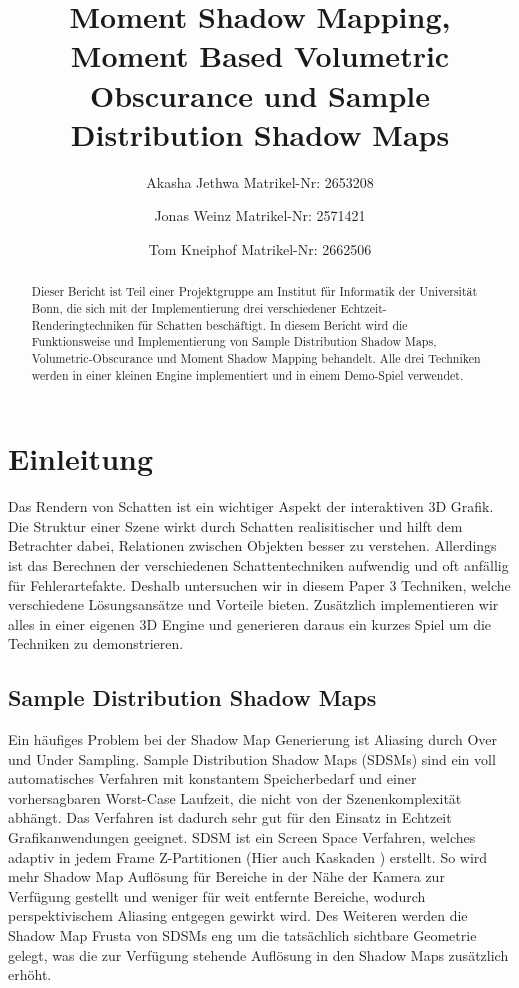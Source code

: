 \documentclass[runningheaders,a4paper]{llncs}
\title{ Moment Shadow Mapping, Moment Based Volumetric Obscurance und Sample Distribution Shadow Maps }
\author{
	Akasha Jethwa 
	Matrikel-Nr: 2653208
	\and
	Jonas Weinz 
	Matrikel-Nr: 2571421
	\and
	Tom Kneiphof 
	Matrikel-Nr: 2662506
}
\institute{Institut für Informatik der Universität Bonn}
\begin{document}
\maketitle

\begin{abstract}
Dieser Bericht ist Teil einer Projektgruppe am Institut für Informatik der Universität Bonn,
die sich mit der Implementierung drei verschiedener Echtzeit-Renderingtechniken für Schatten beschäftigt.
In diesem Bericht wird die Funktionsweise und Implementierung von Sample Distribution Shadow Maps, Volumetric-Obscurance und Moment Shadow Mapping behandelt.
Alle drei Techniken werden in einer kleinen Engine implementiert und in einem Demo-Spiel verwendet.
\end{abstract}


\section{Einleitung}
Das Rendern von Schatten ist ein wichtiger Aspekt der interaktiven 3D Grafik.
Die Struktur einer Szene wirkt durch Schatten realisitischer und hilft dem Betrachter dabei, Relationen zwischen Objekten besser zu verstehen.
Allerdings ist das Berechnen der verschiedenen Schattentechniken aufwendig und oft anfällig für Fehlerartefakte.
Deshalb untersuchen wir in diesem Paper 3 Techniken, welche verschiedene Lösungsansätze und Vorteile bieten.
Zusätzlich implementieren wir alles in einer eigenen 3D Engine und generieren daraus ein kurzes Spiel um die Techniken zu demonstrieren.


\subsection{Sample Distribution Shadow Maps}

Ein häufiges Problem bei der Shadow Map Generierung ist Aliasing durch Over und Under Sampling.
Sample Distribution Shadow Maps (SDSMs) \cite{sdsm} sind ein voll automatisches Verfahren mit konstantem Speicherbedarf und einer vorhersagbaren Worst-Case Laufzeit, die nicht von der Szenenkomplexität abhängt.
Das Verfahren ist dadurch sehr gut für den Einsatz in Echtzeit Grafikanwendungen geeignet.
SDSM ist ein Screen Space Verfahren, welches adaptiv in jedem Frame Z-Partitionen \cite{zpart} (Hier auch Kaskaden \cite{csm}) erstellt.
So wird mehr Shadow Map Auflösung für Bereiche in der Nähe der Kamera zur Verfügung gestellt und weniger für weit entfernte Bereiche, wodurch perspektivischem Aliasing entgegen gewirkt wird.
Des Weiteren werden die Shadow Map Frusta von SDSMs eng um die tatsächlich sichtbare Geometrie gelegt, was die zur Verfügung stehende Auflösung in den Shadow Maps zusätzlich erhöht.
\end{document}
